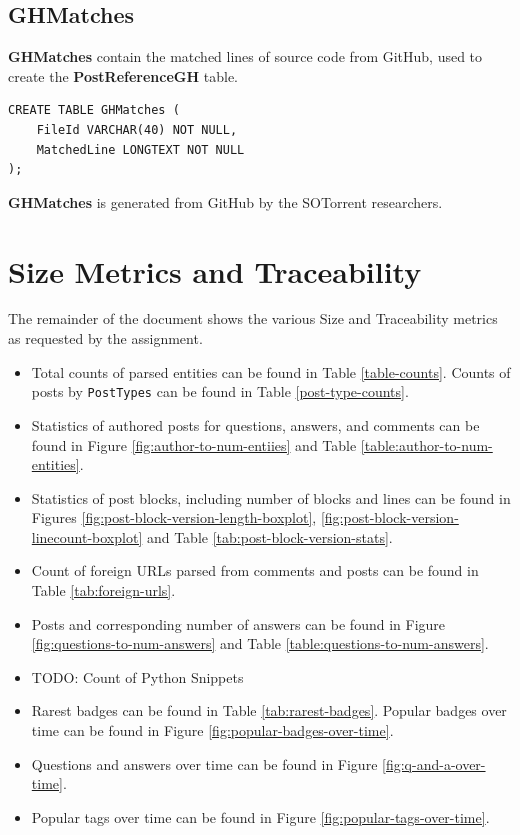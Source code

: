 \documentclass[a4paper,11pt, notitlepage]{report}
\theoremstyle{definition}
\numberwithin{equation}{section}		%
\begin{document}
\subsection{GHMatches}
\textbf{GHMatches} contain the matched lines of source code from GitHub, used to create the \textbf{PostReferenceGH} table.
\begin{lstlisting}
CREATE TABLE GHMatches (
    FileId VARCHAR(40) NOT NULL,
    MatchedLine LONGTEXT NOT NULL
);
\end{lstlisting}
\textbf{GHMatches} is generated from GitHub by the SOTorrent researchers.

\section{Size Metrics and Traceability}

The remainder of the document shows the various Size and Traceability metrics as requested by the assignment.

\begin{itemize}
    \item Total counts of parsed entities can be found in Table \ref{table-counts}. Counts of posts by \texttt{PostTypes} can be found in Table \ref{post-type-counts}.
    \item Statistics of authored posts for questions, answers, and comments can be found in Figure \ref{fig:author-to-num-entiies} and Table \ref{table:author-to-num-entities}.
    \item Statistics of post blocks, including number of blocks and lines can be found in Figures \ref{fig:post-block-version-length-boxplot}, \ref{fig:post-block-version-linecount-boxplot} and Table \ref{tab:post-block-version-stats}.
    \item Count of foreign URLs parsed from comments and posts can be found in Table \ref{tab:foreign-urls}.
    \item Posts and corresponding number of answers can be found in Figure \ref{fig:questions-to-num-answers} and Table \ref{table:questions-to-num-answers}.
    \item TODO: Count of Python Snippets
    \item Rarest badges can be found in Table \ref{tab:rarest-badges}. Popular badges over time can be found in Figure \ref{fig:popular-badges-over-time}.
    \item Questions and answers over time can be found in Figure \ref{fig:q-and-a-over-time}.
    \item Popular tags over time can be found in Figure \ref{fig:popular-tags-over-time}.
\end{itemize}
\end{document}
